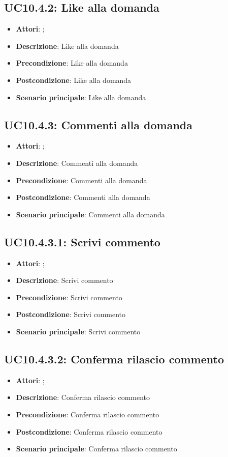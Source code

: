 \subsection{UC10.4.2: Like alla domanda}
\label{UC10.4.2}
\begin{itemize}
\item \textbf{Attori}: ;
\item \textbf{Descrizione}: Like alla domanda
\item \textbf{Precondizione}: Like alla domanda
\item \textbf{Postcondizione}: Like alla domanda
\item \textbf{Scenario principale}:
Like alla domanda
\end{itemize}

\subsection{UC10.4.3: Commenti alla domanda}
\label{UC10.4.3}
\begin{itemize}
\item \textbf{Attori}: ;
\item \textbf{Descrizione}: Commenti alla domanda
\item \textbf{Precondizione}: Commenti alla domanda
\item \textbf{Postcondizione}: Commenti alla domanda
\item \textbf{Scenario principale}:
Commenti alla domanda
\end{itemize}

\subsection{UC10.4.3.1: Scrivi commento}
\label{UC10.4.3.1}
\begin{itemize}
\item \textbf{Attori}: ;
\item \textbf{Descrizione}: Scrivi commento
\item \textbf{Precondizione}: Scrivi commento
\item \textbf{Postcondizione}: Scrivi commento
\item \textbf{Scenario principale}:
Scrivi commento
\end{itemize}

\subsection{UC10.4.3.2: Conferma rilascio commento}
\label{UC10.4.3.2}
\begin{itemize}
\item \textbf{Attori}: ;
\item \textbf{Descrizione}: Conferma rilascio commento
\item \textbf{Precondizione}: Conferma rilascio commento
\item \textbf{Postcondizione}: Conferma rilascio commento
\item \textbf{Scenario principale}:
Conferma rilascio commento
\end{itemize}


